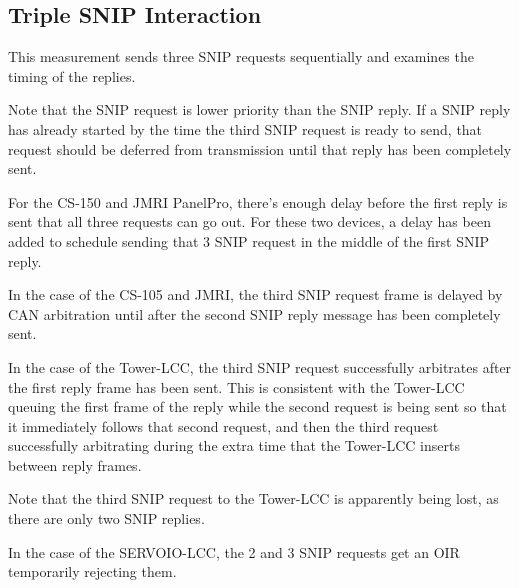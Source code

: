 \documentclass[11pt]{article}
\begin{document}
\clearpage

\subsection{Triple SNIP Interaction}

This measurement sends three SNIP requests sequentially and examines the timing of the replies.

Note that the SNIP request is lower priority than the SNIP reply. 
If a SNIP reply has already started by the time the third SNIP request is ready to send,
that request should be deferred from transmission until that reply has been completely sent.

For the CS-150 and JMRI PanelPro, there's enough delay before the first reply is 
sent that all three requests can go out.  
For these two devices, a delay has been added to schedule sending that 
3 SNIP request in the middle of the first SNIP reply.

In the case of the CS-105 and JMRI, 
the third SNIP request frame is delayed by CAN arbitration until after the
second SNIP reply message has been completely sent.

In the case of the Tower-LCC, the third SNIP request successfully arbitrates after the
first reply frame has been sent.  This is consistent with the Tower-LCC queuing the 
first frame of the reply while the second request is being sent so that it immediately
follows that second request, 
and then the third request successfully arbitrating during the extra
time that the Tower-LCC inserts between reply frames.

Note that the third SNIP request to the Tower-LCC is apparently
being lost, as there are only two SNIP replies.

In the case of the SERVOIO-LCC, the 2 and 3
SNIP requests get an OIR temporarily rejecting them.
\end{document}
